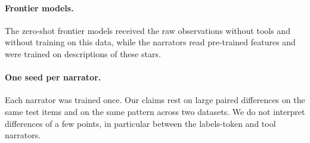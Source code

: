 \paragraph{Frontier models.} The zero-shot frontier models received the raw observations
without tools and without training on this data, while the narrators read pre-trained features
and were trained on descriptions of these stars. 

\paragraph{One seed per narrator.} Each narrator was trained once. Our claims rest on large
paired differences on the same test items and on the same pattern across two datasets. We do
not interpret differences of a few points, in particular between the labels-token and tool
narrators.



